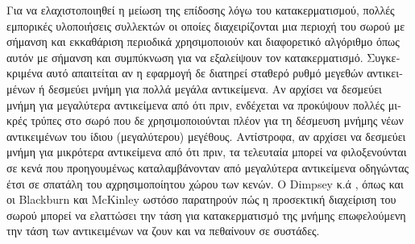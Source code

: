 \begin{greek}
Για να ελαχιστοποιηθεί η μείωση της επίδοσης λόγω του κατακερματισμού,
πολλές εμπορικές υλοποιήσεις συλλεκτών οι οποίες διαχειρίζονται
μια περιοχή του σωρού με σήμανση και εκκαθάριση περιοδικά χρησιμοποιούν
και διαφορετικό αλγόριθμο όπως αυτόν με σήμανση και συμπύκνωση για
να εξαλείψουν τον κατακερματισμό. Συγκεκριμένα αυτό απαιτείται
αν η εφαρμογή δε διατηρεί σταθερό ρυθμό μεγεθών αντικειμένων ή
δεσμεύει μνήμη για πολλά μεγάλα αντικείμενα. Αν αρχίσει να δεσμεύει
μνήμη για μεγαλύτερα αντικείμενα από ότι πριν, ενδέχεται να προκύψουν
πολλές μικρές τρύπες στο σωρό που δε χρησιμοποιούνται πλέον για
τη δέσμευση μνήμης νέων αντικειμένων του ίδιου (μεγαλύτερου)
μεγέθους. Αντίστροφα, αν αρχίσει να δεσμεύει μνήμη για μικρότερα
αντικείμενα από ότι πριν, τα τελευταία μπορεί να φιλοξενούνται
σε κενά που προηγουμένως καταλαμβάνονταν από μεγαλύτερα αντικείμενα
οδηγώντας έτσι σε σπατάλη του αχρησιμοποίητου χώρου των κενών. 
Ο Dimpsey κ.ά \cite{DBLP:journals/ibmsj/DimpseyAK00}, όπως και
οι Blackburn και McKinley \cite{DBLP:conf/pldi/BlackburnM08}
ωστόσο παρατηρούν πώς η προσεκτική διαχείριση του σωρού μπορεί
να ελαττώσει την τάση για κατακερματισμό της μνήμης επωφελούμενη
την τάση των αντικειμένων να ζουν και να πεθαίνουν σε συστάδες.

\end{greek}
